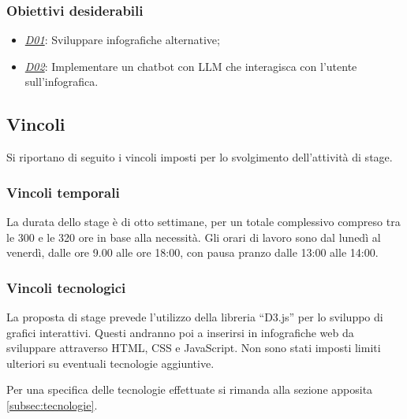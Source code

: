 \subsubsection{Obiettivi desiderabili}
\begin{itemize}
    \item \underline{\textit{D01}}: Sviluppare infografiche alternative;
    \item \underline{\textit{D02}}: Implementare un chatbot con LLM che interagisca con l'utente sull'infografica.
\end{itemize}

\subsection{Vincoli}
Si riportano di seguito i vincoli imposti per lo svolgimento dell'attività di stage.

\subsubsection{Vincoli temporali}
La durata dello stage è di otto settimane, per un totale complessivo compreso tra le 300 e le 320 ore in base alla necessità.
Gli orari di lavoro sono dal lunedì al venerdì, dalle ore 9.00 alle ore 18:00, con pausa pranzo dalle 13:00 alle 14:00.

\subsubsection{Vincoli tecnologici}
La proposta di stage prevede l'utilizzo della libreria ``D3.js'' per lo sviluppo
di grafici interattivi. Questi andranno poi a inserirsi in infografiche web da 
sviluppare attraverso HTML, CSS e JavaScript.
Non sono stati imposti limiti ulteriori su eventuali tecnologie aggiuntive.

Per una specifica delle tecnologie effettuate si rimanda alla sezione apposita \ref{subsec:tecnologie}.



